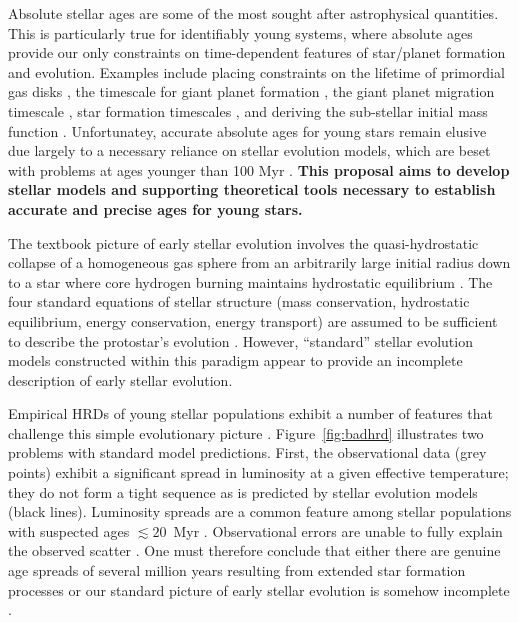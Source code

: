 %
%

Absolute stellar ages are some of the most sought after astrophysical quantities. This is particularly true for identifiably young systems, where absolute ages provide our only constraints on time-dependent features of star/planet formation and evolution. Examples include placing constraints on the lifetime of primordial gas disks \citep[e.g.,][]{Haisch2001, Mamajek2009}, the timescale for giant planet formation \citep{Chabrier2014}, the giant planet migration timescale \citep{}, star formation timescales \citep{Pecaut2016}, and deriving the sub-stellar initial mass function \citep{Chabrier2003}. Unfortunatey, accurate absolute ages for young stars remain elusive \citep{Soderblom2014} due largely to a necessary reliance on stellar evolution models, which are beset with problems at ages younger than 100 Myr \citep[e.g.,][]{Mathieu2007, Stassun2014}. {\bf This proposal aims to develop stellar models and supporting theoretical tools necessary to establish accurate and precise ages for young stars.}

The textbook picture of early stellar evolution involves the quasi-hydrostatic collapse of a homogeneous gas sphere from an arbitrarily large initial radius down to a star where core hydrogen burning maintains hydrostatic equilibrium \citep[e.g.,][]{Henyey1955, Hayashi1961, Iben1965}. The four standard equations of stellar structure (mass conservation, hydrostatic equilibrium, energy conservation, energy transport) are assumed to be sufficient to describe the protostar's evolution \citep{Iben1965, Bodenheimer1965}. However, ``standard'' stellar evolution models constructed within this paradigm appear to provide an incomplete description of early stellar evolution. 


Empirical HRDs of young stellar populations exhibit a number of features that challenge this simple evolutionary picture \citep{Naylor2009, DaRio2010a, Herczeg2015}. Figure~\ref{fig:badhrd} illustrates two problems with standard model predictions. First, the observational data (grey points) exhibit a significant spread in luminosity at a given effective temperature; they do not form a tight sequence as is predicted by stellar evolution models (black lines). Luminosity spreads are a common feature among stellar populations with suspected ages $\lesssim 20$~Myr \citep{Hillenbrand1997, DaRio2010a}. Observational errors are unable to fully explain the observed scatter \citep[e.g.,][]{Jeffries2012, Pecaut2012}. One must therefore conclude that either there are genuine age spreads of several million years resulting from extended star formation processes or our standard picture of early stellar evolution is somehow incomplete \citep{Jeffries2012, Soderblom2014}.


